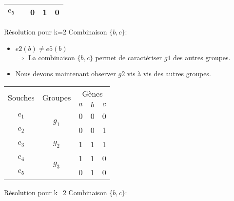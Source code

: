\begin{overprint}
{\begin{minipage}[l]{0.46\linewidth}
\begin{center}
\begin{tabular}{|c||c|c|c|c|}
						\cline{1-1} \cline{3-5}
						$e_5$&& 0 & \cellcolor{cyan}1 & 0\\
						\hline
					\end{tabular}
				\end{center}
			\end{minipage}
			\hspace{0.6cm}
			\begin{minipage}[r]{0.46\linewidth}
				\begin{block}{Résolution pour k=2}
					Combinaison $\{b,c\}$:
					\begin{itemize}
						\item $e2(b) \not = e5(b) $ \\ $\Rightarrow$ La combinaison $\{b,c\}$ permet de caractériser $g1$ des autres groupes.
						\item<26> Nous devons maintenant observer $g2$ vis à vis des autres groupes.
					\end{itemize}
				\end{block}
			\end{minipage}
		}
		{
			\begin{minipage}[l]{0.46\linewidth}
				\begin{center}
					\begin{tabular}{|c||c|c|c|c|}
						\hline
						\multirow{2}{*}{Souches}&\multirow{2}{*}{Groupes}&\multicolumn{3}{c|}{Gènes
						}\\
						&&$a$&\cellcolor{blue!75}$b$&\cellcolor{blue!75}$c$\\
						\hline
						\hline
						$e_1$&\multirow{2}{*}{$g_1$}& 0 & 0 & 0\\
						\cline{1-1} \cline{3-5}
						$e_2$&& 0 & 0 & 1\\
						\hline
						\hline
						$e_3$&$g_2$& 1 & \cellcolor{cyan}1 & 1\\
						\hline
						\hline
						$e_4$&\multirow{2}{*}{$g_3$}& 1 & \cellcolor{cyan}1 & 0\\
						\cline{1-1} \cline{3-5}
						$e_5$&& 0 & 1 & 0\\
						\hline
					\end{tabular}
				\end{center}
			\end{minipage}
			\hspace{0.6cm}
			\begin{minipage}[r]{0.46\linewidth}
				\begin{block}{Résolution pour k=2}
					Combinaison $\{b,c\}$:
					\begin{itemize}

\end{itemize}
\end{block}
\end{minipage}}
\end{overprint}
